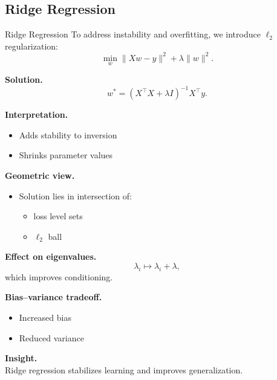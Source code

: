 \documentclass[aspectratio=169,11pt]{beamer}
\begin{document}
\subsection{Ridge Regression}
\begin{frame}[t,allowframebreaks]{Ridge Regression}
\small
To address instability and overfitting, we introduce $\ell_2$ regularization:
\[
\min_w \|Xw - y\|^2 + \lambda \|w\|^2.
\]

\textbf{Solution.}\\ \[
w^* = (X^\top X + \lambda I)^{-1} X^\top y.
\]

\textbf{Interpretation.}\\ \begin{itemize}
    \item Adds stability to inversion
    \item Shrinks parameter values
\end{itemize}

\textbf{Geometric view.}\\ \begin{itemize}
    \item Solution lies in intersection of:
    \begin{itemize}
        \item loss level sets
        \item $\ell_2$ ball
    \end{itemize}
\end{itemize}

\textbf{Effect on eigenvalues.}\\ \[
\lambda_i \mapsto \lambda_i + \lambda,
\]
which improves conditioning.

\textbf{Bias--variance tradeoff.}\\ \begin{itemize}
    \item Increased bias
    \item Reduced variance
\end{itemize}

\textbf{Insight.}\\ Ridge regression stabilizes learning and improves generalization.
\end{frame}
\end{document}
